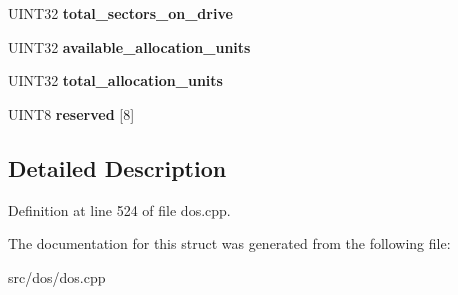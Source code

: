 \begin{DoxyCompactItemize}
\item 
\hypertarget{structext__space__info__t_ab8a6c7ddb65f71817e7520dc484c58ac}{U\-I\-N\-T32 {\bfseries total\-\_\-sectors\-\_\-on\-\_\-drive}}\label{structext__space__info__t_ab8a6c7ddb65f71817e7520dc484c58ac}

\item 
\hypertarget{structext__space__info__t_afd6b2cb9356dc9bf656aca3294b2da88}{U\-I\-N\-T32 {\bfseries available\-\_\-allocation\-\_\-units}}\label{structext__space__info__t_afd6b2cb9356dc9bf656aca3294b2da88}

\item 
\hypertarget{structext__space__info__t_ab9fd490110c04c9835e2c38b98972860}{U\-I\-N\-T32 {\bfseries total\-\_\-allocation\-\_\-units}}\label{structext__space__info__t_ab9fd490110c04c9835e2c38b98972860}

\item 
\hypertarget{structext__space__info__t_a2f5745e3440e812cdfa68f1f3d70a0a7}{U\-I\-N\-T8 {\bfseries reserved} \mbox{[}8\mbox{]}}\label{structext__space__info__t_a2f5745e3440e812cdfa68f1f3d70a0a7}

\end{DoxyCompactItemize}


\subsection{Detailed Description}


Definition at line 524 of file dos.\-cpp.



The documentation for this struct was generated from the following file\-:\begin{DoxyCompactItemize}
\item 
src/dos/dos.\-cpp\end{DoxyCompactItemize}
